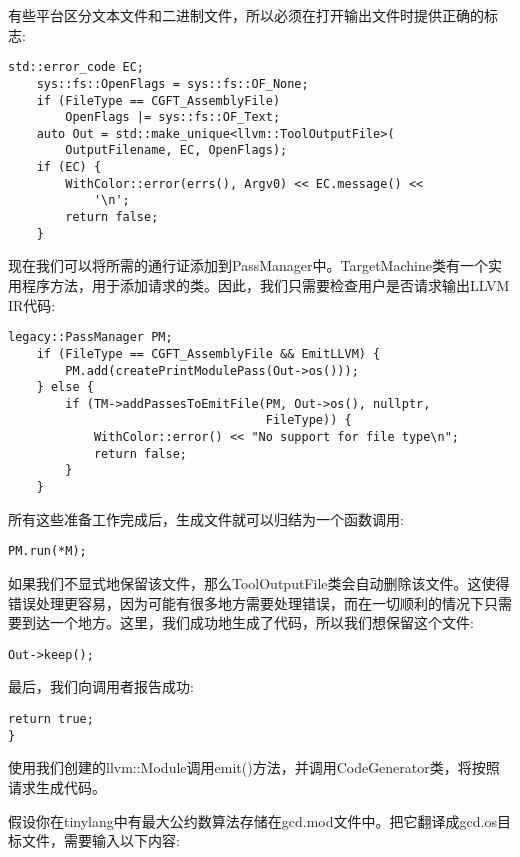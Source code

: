 有些平台区分文本文件和二进制文件，所以必须在打开输出文件时提供正确的标志:\par

\begin{lstlisting}[caption={}]
	std::error_code EC;
	sys::fs::OpenFlags = sys::fs::OF_None;
	if (FileType == CGFT_AssemblyFile)
		OpenFlags |= sys::fs::OF_Text;
	auto Out = std::make_unique<llvm::ToolOutputFile>(
		OutputFilename, EC, OpenFlags);
	if (EC) {
		WithColor::error(errs(), Argv0) << EC.message() <<
			'\n';
		return false;
	}
\end{lstlisting}

现在我们可以将所需的通行证添加到PassManager中。TargetMachine类有一个实用程序方法，用于添加请求的类。因此，我们只需要检查用户是否请求输出LLVM IR代码:\par

\begin{lstlisting}[caption={}]
	legacy::PassManager PM;
	if (FileType == CGFT_AssemblyFile && EmitLLVM) {
		PM.add(createPrintModulePass(Out->os()));
	} else {
		if (TM->addPassesToEmitFile(PM, Out->os(), nullptr,
									FileType)) {
			WithColor::error() << "No support for file type\n";
			return false;
		}
	}
\end{lstlisting}

所有这些准备工作完成后，生成文件就可以归结为一个函数调用:\par

\begin{lstlisting}[caption={}]
	PM.run(*M);
\end{lstlisting}

如果我们不显式地保留该文件，那么ToolOutputFile类会自动删除该文件。这使得错误处理更容易，因为可能有很多地方需要处理错误，而在一切顺利的情况下只需要到达一个地方。这里，我们成功地生成了代码，所以我们想保留这个文件:\par

\begin{lstlisting}[caption={}]
	Out->keep();
\end{lstlisting}

最后，我们向调用者报告成功:\par

\begin{lstlisting}[caption={}]
	return true;
}
\end{lstlisting}

使用我们创建的llvm::Module调用emit()方法，并调用CodeGenerator类，将按照请求生成代码。\par

假设你在tinylang中有最大公约数算法存储在gcd.mod文件中。把它翻译成gcd.os目标文件，需要输入以下内容:\par

